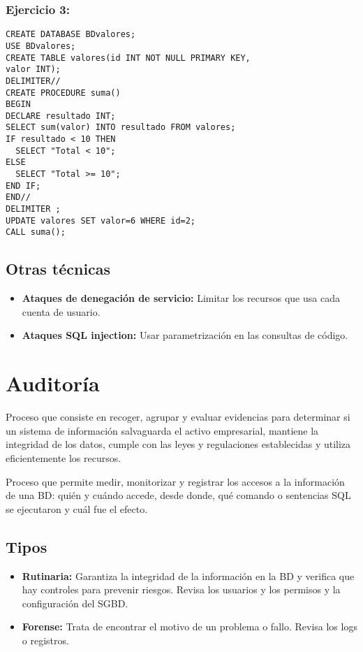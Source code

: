 \documentclass{article}
\begin{document}
\subsubsection{Ejercicio 3:}
\begin{verbatim}
CREATE DATABASE BDvalores;
USE BDvalores;
CREATE TABLE valores(id INT NOT NULL PRIMARY KEY,
valor INT);
DELIMITER//
CREATE PROCEDURE suma()
BEGIN
DECLARE resultado INT;
SELECT sum(valor) INTO resultado FROM valores;
IF resultado < 10 THEN
  SELECT "Total < 10";
ELSE
  SELECT "Total >= 10";
END IF;
END//
DELIMITER ;
UPDATE valores SET valor=6 WHERE id=2;
CALL suma();
\end{verbatim}
\subsection{Otras técnicas}
\begin{itemize}
	\item \textbf{Ataques de denegación de servicio:} Limitar los recursos que usa cada cuenta de usuario. 
	\item \textbf{Ataques SQL injection: }Usar parametrización en las consultas de código.
\end{itemize}
\section{Auditoría}
\begin{theorem}
Proceso que consiste en recoger, agrupar y evaluar evidencias para determinar si un sistema de información salvaguarda el activo empresarial, mantiene la integridad de los datos, cumple con las leyes y regulaciones establecidas y utiliza eficientemente los recursos. 
\end{theorem}
\begin{theorem}
Proceso que permite medir, monitorizar y registrar los accesos a la información de una BD: quién y cuándo accede, desde donde, qué comando o sentencias SQL se ejecutaron y cuál fue el efecto. 
\end{theorem}
\subsection{Tipos}
\begin{itemize}
	\item \textbf{Rutinaria: }Garantiza la integridad de la información en la BD y verifica que hay controles para prevenir riesgos. Revisa los usuarios y los permisos y la configuración del SGBD.
	\item \textbf{Forense: }Trata de encontrar el motivo de un problema o fallo. Revisa los logs o registros.
\end{itemize}
\end{document}
